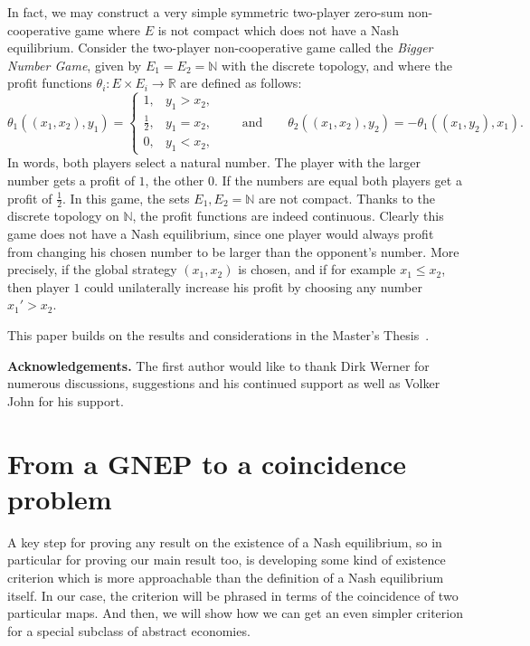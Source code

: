 \documentclass[a4paper,11pt,reqno,english]{amsart}
\theoremstyle{definition}
\begin{document}
In fact, we may construct a very simple symmetric two-player zero-sum non-cooperative game where $E$ is not compact which does not have a Nash equilibrium.
Consider the two-player non-cooperative game called the \textit{Bigger Number Game}, given by $E_1=E_2=\mathbb{N}$ with the discrete topology, and where the profit functions $\theta_i\colon E\times E_i\longrightarrow \mathbb{R}$ are defined as follows:
\begin{displaymath}
	\theta_1((x_1,x_2),y_1) =  \begin{cases}
		1,           & y_1 > x_2, \\
		\frac{1}{2}, & y_1 = x_2, \\
		0,           & y_1 < x_2,
	\end{cases} \qquad \text{and} \qquad
	\theta_2((x_1,x_2),y_2) =  -\theta_1((x_1,y_2), x_1).
\end{displaymath}
In words, both players select a natural number. The player with the larger number gets a profit of $1$, the other $0$. If the numbers are equal both players get a profit of $\tfrac{1}{2}$.
In this game, the sets $E_1,E_2=\mathbb{N}$ are not compact. Thanks to the discrete topology on $\mathbb{N}$, the profit functions are indeed continuous.
Clearly this game does not have a Nash equilibrium, since one player would always profit from changing his chosen number to be larger than the opponent's number. More precisely, if the global strategy $(x_1,x_2)$ is chosen, and if for example $x_1\leq x_2$, then player $1$ could unilaterally increase his profit by choosing any number $x_1' > x_2$.

\medskip This paper builds on the results and considerations in the Master's Thesis~\cite{Blagojevic2024}.

\medskip\noindent
\textbf{Acknowledgements.}
The first author would like to thank Dirk Werner for numerous discussions, suggestions and his continued support as well as Volker John for his support.

\medskip



\section{From a GNEP to a coincidence problem}

A key step for proving any result on the existence of a Nash equilibrium, so in particular for proving our main result too, is developing some kind of existence criterion which is more approachable than the definition of a Nash equilibrium itself. In our case, the criterion will be phrased in terms of the coincidence of two particular maps. And then, we will show how we can get an even simpler criterion for a special subclass of abstract economies.
\end{document}
